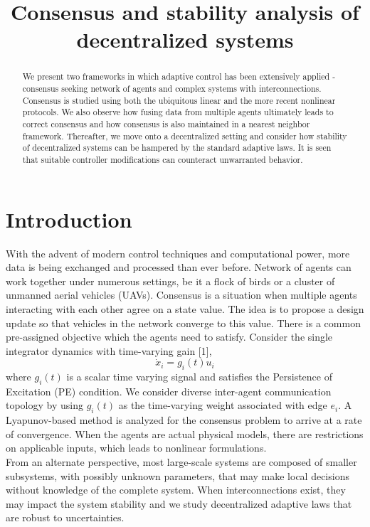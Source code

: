 \documentclass[journal]{IEEEtran}
\begin{document}
\title{Consensus and stability analysis of decentralized systems}

\maketitle

\IEEEpeerreviewmaketitle

\begin{abstract}
We present two frameworks in which adaptive control has been extensively applied - consensus seeking network of agents and complex systems with interconnections. Consensus is studied using both the ubiquitous linear and the more recent nonlinear protocols. We also observe how fusing data from multiple agents ultimately leads to correct consensus and how consensus is also maintained in a nearest neighbor framework. Thereafter, we move onto a decentralized setting and consider how stability of decentralized systems can be hampered by the standard adaptive laws. It is seen that suitable controller modifications can counteract unwarranted behavior. 
\end{abstract}



\section{Introduction}

With the advent of modern control techniques and computational power, more data is being exchanged and processed than ever before. Network of agents can work together under numerous settings, be it a flock of birds or a cluster of unmanned aerial vehicles (UAVs). Consensus is a situation when multiple agents interacting with each other agree on a state value. The idea is to propose a design update so that vehicles in the network converge to this value. There is a common pre-assigned objective which the agents need to satisfy. Consider the single integrator dynamics with time-varying gain [1], \begin{equation} \dot{x}_i = g_i(t)u_i \end{equation} 
where $g_i(t)$ is  a scalar time varying signal and satisfies the
Persistence of Excitation (PE) condition. We
consider diverse inter-agent communication topology by using $g_i(t)$
as the time-varying weight associated with edge $e_i$. A Lyapunov-based method is analyzed for the consensus problem to arrive at a rate of convergence. When the agents are actual physical models, there are restrictions on applicable inputs, which leads to nonlinear formulations. \\ From an alternate perspective, most large-scale systems are composed of smaller subsystems, with possibly unknown parameters, that may make local decisions without knowledge of the complete system. When interconnections exist, they may impact the system stability and we study decentralized adaptive laws that are robust to uncertainties. 
\end{document}
